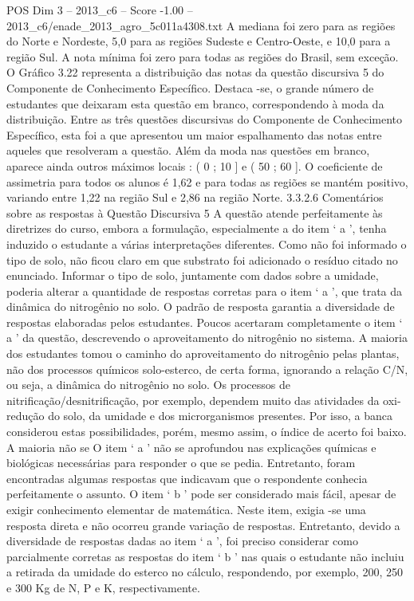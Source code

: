 \begin{textsample}{POS Dim 3 – 2013\_c6 – Score -1.00 – 2013\_c6/enade\_2013\_agro\_5c011a4308.txt}
A mediana foi zero para as regiões do Norte e Nordeste, 5,0 para as regiões Sudeste e Centro-Oeste, e 10,0 para a região Sul.
A nota mínima foi zero para todas as regiões do Brasil, sem exceção.
O Gráfico 3.22 representa a distribuição das notas da questão discursiva 5 do Componente de Conhecimento Específico.
Destaca -se, o grande número de estudantes que deixaram esta questão em branco, correspondendo à moda da distribuição.
Entre as três questões discursivas do Componente de Conhecimento Específico, esta foi a que apresentou um maior espalhamento das notas entre aqueles que resolveram a questão.
Além da moda nas questões em branco, aparece ainda outros máximos locais : ( 0 ; 10 ] e ( 50 ; 60 ].
O coeficiente de assimetria para todos os alunos é 1,62 e para todas as regiões se mantém positivo, variando entre 1,22 na região Sul e 2,86 na região Norte. 3.3.2.6 Comentários sobre as respostas à Questão Discursiva 5 A questão atende perfeitamente às diretrizes do curso, embora a formulação, especialmente a do item ‘ a ’, tenha induzido o estudante a várias interpretações diferentes.
Como não foi informado o tipo de solo, não ficou claro em que substrato foi adicionado o resíduo citado no enunciado.
Informar o tipo de solo, juntamente com dados sobre a umidade, poderia alterar a quantidade de respostas corretas para o item ‘ a ’, que trata da dinâmica do nitrogênio no solo.
O padrão de resposta garantia a diversidade de respostas elaboradas pelos estudantes.
Poucos acertaram completamente o item ‘ a ’ da questão, descrevendo o aproveitamento do nitrogênio no sistema.
A maioria dos estudantes tomou o caminho do aproveitamento do nitrogênio pelas plantas, não dos processos químicos solo-esterco, de certa forma, ignorando a relação C/N, ou seja, a dinâmica do nitrogênio no solo.
Os processos de nitrificação/desnitrificação, por exemplo, dependem muito das atividades da oxi-redução do solo, da umidade e dos microrganismos presentes.
Por isso, a banca considerou estas possibilidades, porém, mesmo assim, o índice de acerto foi baixo.
A maioria não se O item ‘ a ’ não se aprofundou nas explicações químicas e biológicas necessárias para responder o que se pedia.
Entretanto, foram encontradas algumas respostas que indicavam que o respondente conhecia perfeitamente o assunto.
O item ‘ b ’ pode ser considerado mais fácil, apesar de exigir conhecimento elementar de matemática.
Neste item, exigia -se uma resposta direta e não ocorreu grande variação de respostas.
Entretanto, devido a diversidade de respostas dadas ao item ‘ a ’, foi preciso considerar como parcialmente corretas as respostas do item ‘ b ’ nas quais o estudante não incluiu a retirada da umidade do esterco no cálculo, respondendo, por exemplo, 200, 250 e 300 Kg de N, P e K, respectivamente.

\end{textsample}
